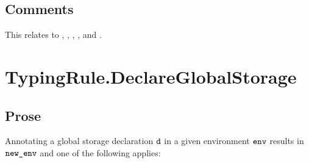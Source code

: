\documentclass{book}
\begin{document}
\subsection{Comments}

This relates to , , , , and .

\section{TypingRule.DeclareGlobalStorage \label{sec:TypingRule.DeclareGlobalStorage}}
\subsection{Prose}
Annotating a global storage declaration $\texttt{d}$ in a given environment $\texttt{env}$ results
in $\texttt{new\_env}$ and one of the following applies:
\end{document}
